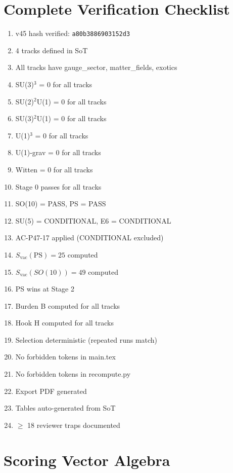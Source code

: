 \documentclass[11pt,a4paper]{article}
\begin{document}
\section{Complete Verification Checklist}
\label{app:checklist}

\begin{enumerate}
\item[$\square$] v45 hash verified: \texttt{a80b3886903152d3}
\item[$\square$] 4 tracks defined in SoT
\item[$\square$] All tracks have gauge\_sector, matter\_fields, exotics
\item[$\square$] SU(3)$^3$ = 0 for all tracks
\item[$\square$] SU(2)$^2$U(1) = 0 for all tracks
\item[$\square$] SU(3)$^2$U(1) = 0 for all tracks
\item[$\square$] U(1)$^3$ = 0 for all tracks
\item[$\square$] U(1)-grav = 0 for all tracks
\item[$\square$] Witten = 0 for all tracks
\item[$\square$] Stage 0 passes for all tracks
\item[$\square$] SO(10) = PASS, PS = PASS
\item[$\square$] SU(5) = CONDITIONAL, E6 = CONDITIONAL
\item[$\square$] AC-P47-17 applied (CONDITIONAL excluded)
\item[$\square$] $S_{\text{vac}}(\text{PS}) = 25$ computed
\item[$\square$] $S_{\text{vac}}(SO(10)) = 49$ computed
\item[$\square$] PS wins at Stage 2
\item[$\square$] Burden B computed for all tracks
\item[$\square$] Hook H computed for all tracks
\item[$\square$] Selection deterministic (repeated runs match)
\item[$\square$] No forbidden tokens in main.tex
\item[$\square$] No forbidden tokens in recompute.py
\item[$\square$] Export PDF generated
\item[$\square$] Tables auto-generated from SoT
\item[$\square$] $\geq$ 18 reviewer traps documented
\end{enumerate}

\section{Scoring Vector Algebra}
\label{app:scoring-algebra}
\end{document}
